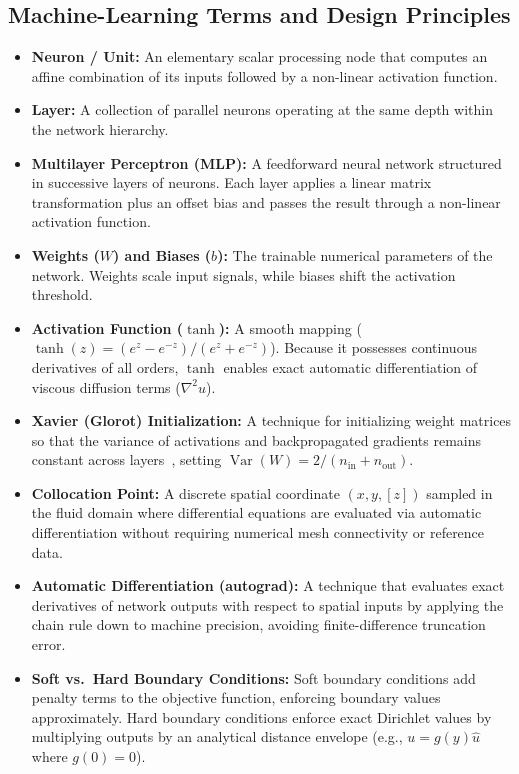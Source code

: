 \documentclass[11pt,a4paper]{article}
\begin{document}
\subsection{Machine-Learning Terms and Design Principles}
\begin{itemize}[leftmargin=1.5em]
    \item \textbf{Neuron / Unit:} An elementary scalar processing node that computes an affine combination of its inputs followed by a non-linear activation function.
    \item \textbf{Layer:} A collection of parallel neurons operating at the same depth within the network hierarchy.
    \item \textbf{Multilayer Perceptron (MLP):} A feedforward neural network structured in successive layers of neurons. Each layer applies a linear matrix transformation plus an offset bias and passes the result through a non-linear activation function.
    \item \textbf{Weights ($W$) and Biases ($b$):} The trainable numerical parameters of the network. Weights scale input signals, while biases shift the activation threshold.
    \item \textbf{Activation Function ($\tanh$):} A smooth mapping ($\tanh(z) = (e^z - e^{-z})/(e^z + e^{-z})$). Because it possesses continuous derivatives of all orders, $\tanh$ enables exact automatic differentiation of viscous diffusion terms ($\nabla^2 u$).
    \item \textbf{Xavier (Glorot) Initialization:} A technique for initializing weight matrices so that the variance of activations and backpropagated gradients remains constant across layers~\cite[Eq.~(12), p.~253]{glorot2010}, setting $\operatorname{Var}(W) = 2/(n_{\mathrm{in}} + n_{\mathrm{out}})$.
    \item \textbf{Collocation Point:} A discrete spatial coordinate $(x, y, [z])$ sampled in the fluid domain where differential equations are evaluated via automatic differentiation without requiring numerical mesh connectivity or reference data.
    \item \textbf{Automatic Differentiation (autograd):} A technique that evaluates exact derivatives of network outputs with respect to spatial inputs by applying the chain rule down to machine precision, avoiding finite-difference truncation error.
    \item \textbf{Soft vs.\ Hard Boundary Conditions:} Soft boundary conditions add penalty terms to the objective function, enforcing boundary values approximately. Hard boundary conditions enforce exact Dirichlet values by multiplying outputs by an analytical distance envelope (e.g., $u = g(y) \hat{u}$ where $g(0) = 0$).

\end{itemize}
\end{document}
